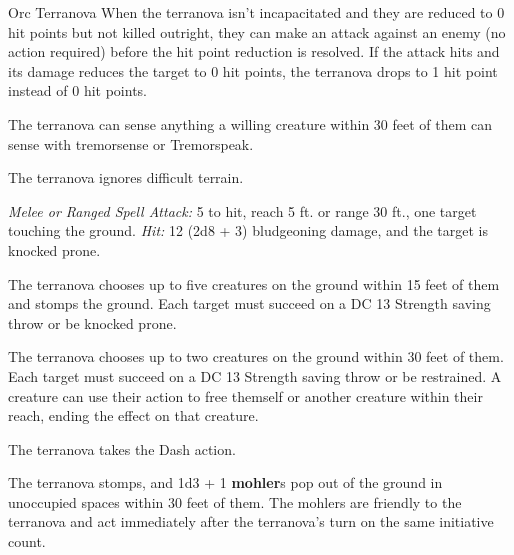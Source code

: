 \documentclass[10pt,a4paper,twoside,bg=print,twocolumn,openany,nodeprecatedcode]{dndbook}
\begin{document}
\begin{DndMonster}[float=t]{Orc Terranova}
\DndMonsterBasics[
armor-class = {15 (\textit{breastplate})},
hit-points = {\DndDice{5d8 + 15}},
speed = {35 ft.}
]
\DndMonsterAbilityScores[
 str = 14,
 dex = 12,
 con = 16,
 int = 12,
 wis = 9,
 cha = 16
]
\DndMonsterDetails[
skills = {Athletics +4},
condition-immunities = {prone},
senses = {darkvision 60 ft., tremorsense 30 ft., passive perception 9},
languages = {Common, Orc},
challenge = 2,
]
When the terranova isn't incapacitated and they are reduced to 0 hit points but not killed outright, they can make an attack against an enemy (no action required) before the hit point reduction is resolved. If the attack hits and its damage reduces the target to 0 hit points, the terranova drops to 1 hit point instead of 0 hit points.

The terranova can sense anything a willing creature within 30 feet of them can sense with tremorsense or Tremorspeak.

The terranova ignores difficult terrain.

\textsl{Melee or Ranged Spell Attack:} 5 to hit, reach 5 ft. or range 30 ft., one target touching the ground. \textsl{Hit:} 12 (2d8 + 3) bludgeoning damage, and the target is knocked prone.

The terranova chooses up to five creatures on the ground within 15 feet of them and stomps the ground. Each target must succeed on a DC 13 Strength saving throw or be knocked prone.

The terranova chooses up to two creatures on the ground within 30 feet of them. Each target must succeed on a DC 13 Strength saving throw or be restrained. A creature can use their action to free themself or another creature within their reach, ending the effect on that creature.

The terranova takes the Dash action.

The terranova stomps, and 1d3 + 1 \textbf{mohler}s pop out of the ground in unoccupied spaces within 30 feet of them. The mohlers are friendly to the terranova and act immediately after the terranova's turn on the same initiative count.

\end{DndMonster}
\end{document}
